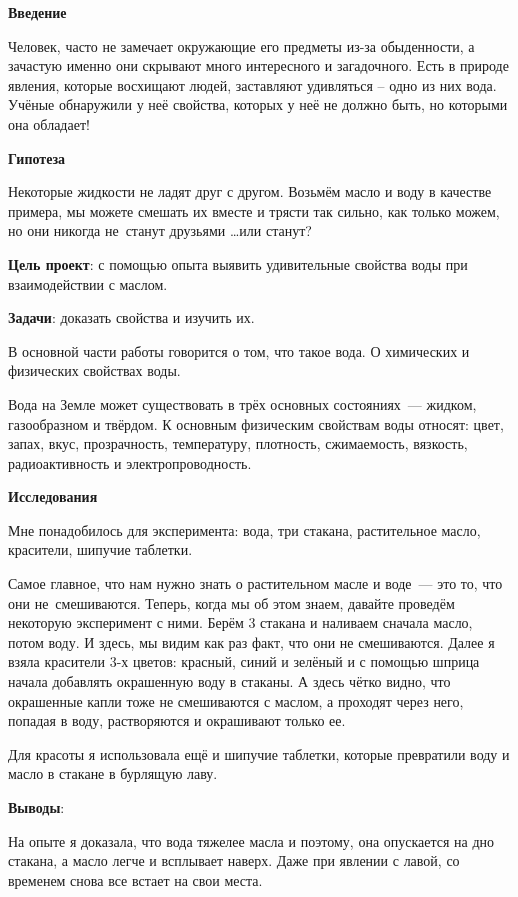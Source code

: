 


\makeProcTitleSchool



\textbf{Введение}

Человек, часто не замечает окружающие его предметы из-за обыденности, а зачастую именно они скрывают много интересного и загадочного. Есть в природе явления, которые восхищают людей, заставляют удивляться – одно из них вода. Учёные обнаружили у неё свойства, которых у неё не должно быть, но которыми она обладает!

\textbf{Гипотеза}

Некоторые жидкости не ладят друг с другом. Возьмём масло и воду в качестве примера, мы можете смешать их вместе и трясти так сильно, как только можем, но они никогда не~станут друзьями \dots или станут?

\textbf{Цель проект}: с помощью опыта выявить удивительные свойства воды при взаимодействии с маслом.

\textbf{Задачи}: доказать свойства и изучить их.

В основной части работы говорится о том, что такое вода. О химических и физических свойствах воды.

Вода на Земле может существовать в трёх основных состояниях~--- жидком, газообразном и твёрдом. К основным физическим свойствам воды относят: цвет, запах, вкус, прозрачность, температуру, плотность, сжимаемость, вязкость, радиоактивность и электропроводность.

\textbf{Исследования}

Мне понадобилось для эксперимента: вода, три стакана, растительное масло, красители, шипучие таблетки.

Самое главное, что нам нужно знать о растительном масле и воде~--- это то, что они не~смешиваются. Теперь, когда мы об этом знаем, давайте проведём некоторую эксперимент с ними. Берём 3 стакана и наливаем сначала масло, потом воду.	И здесь, мы видим как раз факт, что они не смешиваются. Далее я взяла красители 3-х цветов: красный, синий и зелёный и с помощью шприца начала добавлять окрашенную воду в стаканы. А здесь чётко видно, что окрашенные капли тоже не смешиваются с маслом, а проходят через него,  попадая в воду, растворяются и окрашивают только ее.

Для красоты я использовала ещё и шипучие таблетки, которые превратили воду и масло в стакане в бурлящую лаву.

\textbf{Выводы}:

На опыте я доказала, что вода тяжелее масла и поэтому,  она опускается на дно стакана, а масло легче и всплывает наверх. Даже при явлении с лавой, со временем  снова все встает на свои места.
